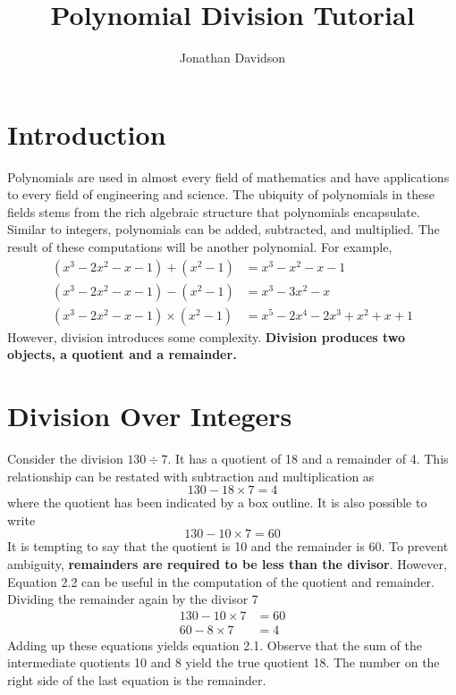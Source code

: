 \documentclass[12pt]{article}
\title{Polynomial Division Tutorial}
\author{Jonathan Davidson}
\date{}
\numberwithin{equation}{section}
\begin{document}
\maketitle

\section{Introduction}
Polynomials are used in almost every field of mathematics and have applications to every field of engineering and science. The ubiquity of polynomials in these fields stems from the rich algebraic structure that polynomials encapsulate. Similar to integers, polynomials can be added, subtracted, and multiplied. The result of these computations will be another polynomial. For example,
\begin{align*}
(x^3-2x^2-x-1) + (x^2-1) &= x^3-x^2-x-1 \\
(x^3-2x^2-x-1) - (x^2-1)&= x^3-3x^2-x \\
(x^3-2x^2-x-1) \times (x^2-1) &= x^5-2x^4-2x^3+x^2+x+1
\end{align*}
However, division introduces some complexity. \textbf{Division produces two objects, a quotient and a remainder.}
\section{Division Over Integers}
Consider the division $130 \div 7$. It has a quotient of 18 and a remainder of 4. This relationship can be restated with subtraction and multiplication as
\begin{equation}
130 - \boxed{18} \times 7 = 4
\end{equation}
where the quotient has been indicated by a box outline. It is also possible to write
\begin{equation}
130 - \boxed{10} \times 7 = 60
\end{equation}
It is tempting to say that the quotient is 10 and the remainder is 60. To prevent  ambiguity, \textbf{remainders are required to be less than the divisor}. However, Equation 2.2 can be useful in the computation of the quotient and remainder. Dividing the remainder again by the divisor 7
\begin{align*}
130 - \boxed{10} \times 7 &= 60 \\
60 - \boxed{8} \times 7 &= 4
\end{align*}
Adding up these equations yields equation 2.1. Observe that the sum of the  intermediate quotients 10 and 8 yield the true quotient 18. The number on the right side of the last equation is the remainder.
\end{document}
